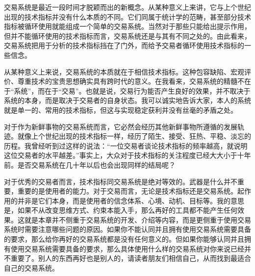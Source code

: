 交易系统是最近一段时间才脱颖而出的新概念。从某种意义上来讲，它与上个世纪出现的技术指标并没有什么本质的不同。它们同属于统计学的范畴，甚至部分技术指标被循环使用就能组成一个简单的交易系统。当然对于那些只能给出提示作用，但并不能循环使用的技术指标而言，交易系统还是与其有不同之处的。由此看来，交易系统把用于分析的技术指标挡在了门外，而给予交易者循环使用技术指标的一些信念。

从某种意义上来说，交易系统的本质就在于相信技术指标。这种包容缺陷、宏观评价、尊重技术的宝贵思想确实具有跨时代的意义。在我看来，交易系统的精髓不在于“系统”，而在于“交易”。也就是说，交易行为能否产生良好的效果，并不取决于系统的本身，而是取决于交易者的自身状态。我可以诚实地告诉大家，本人的系统就是单一的、常用的技术指标，但这与实现稳定获利并没有丝毫的矛盾之处。

对于作为新鲜事物的交易系统而言，它必然会经历其他新鲜事物所遵循的发展轨迹。就像上个世纪出现的技术指标一样，经历了陌生、接受、狂热、平稳、淡忘的历程。我曾经听到过这样的说法：“一位交易者谈论技术指标的频率越高，就说明这位交易者的水平越差。”事实上，大众对于技术指标的关注程度已经大大小于十年前。是否交易系统在几十年以后也会出现同样的结局呢？

对于优秀的交易者而言，技术指标同交易系统是绝对等效的。武器是什么并不重要，重要的是使用者的能力。对于交易而言，无论是技术指标还是交易系统。起作用的并非是它们本身，而是使用者的信念体系、心境、动机、目标等。我的意思是，如果不从改变思维方式、约束本能入手，那么再好的工具都不能产生任何效果。这就是本章并不侧重于交易系统的开发、介绍等内容，而是更侧重于使用交易系统时需要注意哪些问题的原因。如果你不能认同并且拥有使用交易系统需要具备的要求，那么给你再好的交易系统都是没有任何意义的。但如果你能够认同并且拥有使用交易系统需要具备的要求，那么具体使用什么样的交易系统对你来说已经并不重要了。别人的东西再好也是别人的，请读者朋友们相信自己，从而找到最适合自己的交易系统。

\clearpage
